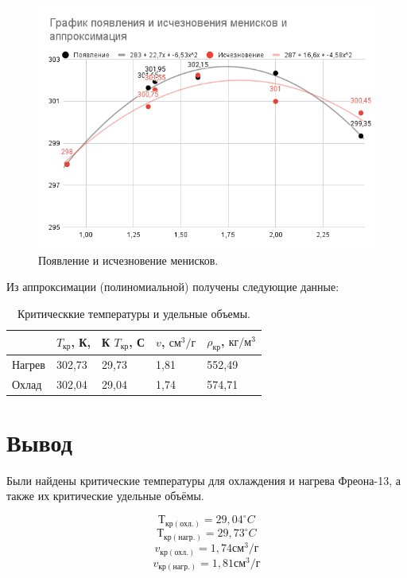 \documentclass[a4paper,14pt]{article}
\begin{document}
\begin{figure}[h]
    \centering
    \includegraphics[scale=0.7]{exp.png}
    \caption{Появление и исчезновение менисков.}
\end{figure}



Из аппроксимации (полиномиальной) получены следующие данные:
\begin{table}[!h]
    \centering
    \begin{tabular}{|l|l|l|l|l|}
    \hline
         & $T_{кр}$, К, & К $T_{кр}$, С & $v$, $см^3/г$ & $\rho_{кр}$, $кг/м^3$ \\ \hline
        Нагрев & 302,73 & 29,73 & 1,81 & 552,49 \\ \hline
        Охлад & 302,04 & 29,04 & 1,74 & 574,71 \\ \hline
    \end{tabular}
    \caption{Критическкие температуры и удельные объемы.}
\end{table}

\section{Вывод}

Были найдены критические температуры для охлаждения и нагрева Фреона-13, а также их критические удельные объёмы.

$$Т_{кр(охл.)} = 29,04^\circ C$$
$$Т_{кр(нагр.)} = 29,73^\circ C$$
$$v_{кр(охл.)} = 1,74 см^3/г$$
$$v_{кр(нагр.)} = 1,81 см^3/г$$
\end{document}
